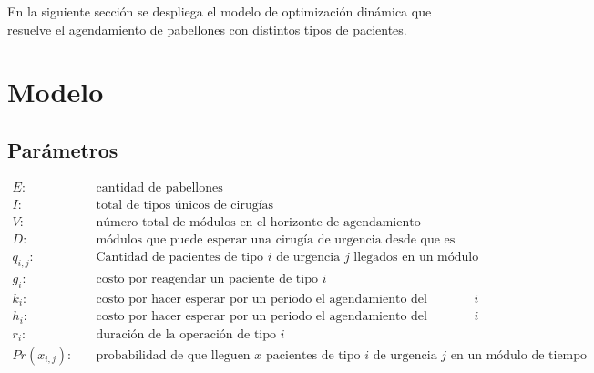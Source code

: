 \documentclass[letterpaper,10pt]{article}
\begin{document}
En la siguiente sección se despliega el modelo de optimización dinámica que resuelve el agendamiento de pabellones con distintos tipos de pacientes.

\section*{Modelo}

\subsection*{Parámetros}

    \begin{align*}
        E: & \quad \text{cantidad de pabellones} \\
        I: & \quad \text{total de tipos únicos de cirugías} \\ %
        V: & \quad \text{número total de módulos en el horizonte de agendamiento} \\
        D: & \quad \text{módulos que puede esperar una cirugía de urgencia desde que es agendada} \\
        q_{i,j}: &\quad \text{Cantidad de pacientes de tipo $i$ de urgencia $j$ llegados en un módulo} \\
        g_{i}: & \quad \text{costo por reagendar un paciente de tipo $i$} \\
        k_{i}: & \quad \text{costo por hacer esperar por un periodo el agendamiento del paciente urgente de tipo $i$} \\
        h_{i}: & \quad \text{costo por hacer esperar por un periodo el agendamiento del paciente de tipo $i$} \\
        r_i: & \quad \text{duración de la operación de tipo $i$} \\
        Pr(x_{i,j}): &  \quad \text{probabilidad de  que lleguen $x$ pacientes de tipo $i$ de urgencia $j$ en un módulo de tiempo} \\
    \end{align*}
    
\end{document}
